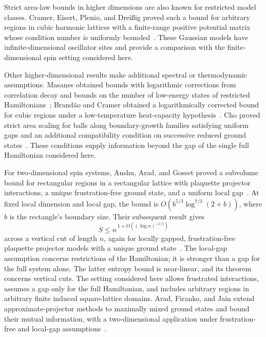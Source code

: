 Strict area-law bounds in higher dimensions are also known for
restricted model classes.  Cramer, Eisert, Plenio, and Drei\ss ig proved
such a bound for arbitrary regions in cubic harmonic lattices with a
finite-range positive potential matrix whose condition number is
uniformly bounded~\cite{CramerEisertPlenioDreissig2006}.  These Gaussian
models have infinite-dimensional oscillator sites and provide a
comparison with the finite-dimensional spin setting considered here.

Other higher-dimensional results make additional spectral or thermodynamic
assumptions.  Masanes obtained bounds with logarithmic corrections from correlation
decay and bounds on the number of low-energy states of restricted
Hamiltonians~\cite{Masanes2009}; Brand\~ao and Cramer obtained a logarithmically
corrected bound for cubic regions under a low-temperature heat-capacity
hypothesis~\cite{BrandaoCramer2015}.  Cho proved strict area scaling for
balls along boundary-growth families satisfying uniform gaps and an
additional compatibility condition on successive reduced ground
states~\cite{Cho2014}.  These conditions supply information beyond the gap
of the single full Hamiltonian considered here.

For two-dimensional spin systems, Anshu, Arad, and Gosset proved a
subvolume bound for rectangular regions in a rectangular lattice with
plaquette projector interactions, a unique frustration-free ground
state, and a uniform local gap~\cite{AnshuAradGosset2022Subvolume}.
At fixed local dimension and local gap, the bound is
\(O(b^{5/3}\log^{7/3}(2+b))\), where \(b\) is the rectangle's boundary
size.  Their subsequent result gives
\[
  S\le n^{\,1+O((\log n)^{-1/5})}
\]
across a vertical cut of length \(n\), again for locally gapped,
frustration-free plaquette projector models with a unique ground
state~\cite{AnshuAradGosset2022Area}.  The local-gap assumption concerns
restrictions of the Hamiltonian; it is stronger than a gap for the full
system alone.  The latter entropy bound is near-linear, and its theorem
concerns vertical cuts.  The setting considered here allows frustrated
interactions, assumes a gap only for the full Hamiltonian, and includes
arbitrary regions in arbitrary finite induced square-lattice domains.
Arad, Firanko, and Jain extend approximate-projector methods to
maximally mixed ground states and bound their mutual information, with a
two-dimensional application under frustration-free and local-gap
assumptions~\cite{AradFirankoJain2026}.

